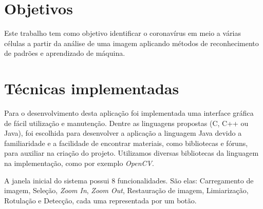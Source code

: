 \documentclass[conference, brazil]{IEEEtran}
\begin{document}
\section{Objetivos}
\label{sec:design}
Este trabalho tem como objetivo identificar o coronavírus em meio a várias células a partir da análise de uma imagem aplicando métodos de reconhecimento de padrões e aprendizado de máquina.

\section{Técnicas implementadas}
\label{sec:design}

Para o desenvolvimento desta aplicação foi implementada uma interface gráfica de fácil utilização e manutenção. Dentre as linguagens propostas (C, C++ ou Java), foi escolhida para desenvolver a aplicação a linguagem Java devido a familiaridade e a facilidade de encontrar materiais, como bibliotecas e fóruns, para auxiliar na criação do projeto. Utilizamos diversas bibliotecas da linguagem na implementação, como por exemplo \textit{OpenCV}. %

A janela inicial do sistema possui 8 funcionalidades. São elas: Carregamento de imagem, Seleção, \textit{Zoom In}, \textit{Zoom Out}, Restauração de imagem, Limiarização, Rotulação e Detecção, cada uma representada por um botão.
\end{document}

